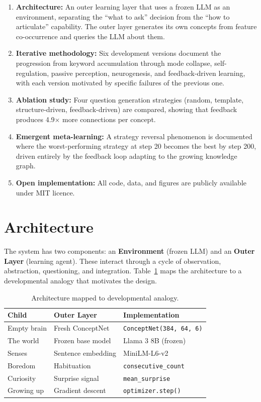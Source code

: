 \documentclass[conference]{IEEEtran}
\begin{document}
\begin{enumerate}[leftmargin=*]
\item \textbf{Architecture:} An outer learning layer that uses a frozen LLM as an environment, separating the ``what to ask'' decision from the ``how to articulate'' capability. The outer layer generates its own concepts from feature co-occurrence and queries the LLM about them.
\item \textbf{Iterative methodology:} Six development versions document the progression from keyword accumulation through mode collapse, self-regulation, passive perception, neurogenesis, and feedback-driven learning, with each version motivated by specific failures of the previous one.
\item \textbf{Ablation study:} Four question generation strategies (random, template, structure-driven, feedback-driven) are compared, showing that feedback produces 4.9$\times$ more connections per concept.
\item \textbf{Emergent meta-learning:} A strategy reversal phenomenon is documented where the worst-performing strategy at step 20 becomes the best by step 200, driven entirely by the feedback loop adapting to the growing knowledge graph.
\item \textbf{Open implementation:} All code, data, and figures are publicly available under MIT licence.
\end{enumerate}


\section{Architecture}
\label{sec:arch}

The system has two components: an \textbf{Environment} (frozen LLM) and an \textbf{Outer Layer} (learning agent). These interact through a cycle of observation, abstraction, questioning, and integration. Table~\ref{tab:analogy} maps the architecture to a developmental analogy that motivates the design.

\begin{table}[!htbp]
\centering
\caption{Architecture mapped to developmental analogy.}
\begin{tabular}{lll}
\toprule
\textbf{Child} & \textbf{Outer Layer} & \textbf{Implementation} \\
\midrule
Empty brain & Fresh ConceptNet & \texttt{ConceptNet(384, 64, 6)} \\
The world & Frozen base model & Llama 3 8B (frozen) \\
Senses & Sentence embedding & MiniLM-L6-v2 \\
Boredom & Habituation & \texttt{consecutive\_count} \\
Curiosity & Surprise signal & \texttt{mean\_surprise} \\
Growing up & Gradient descent & \texttt{optimizer.step()} \\
\bottomrule
\end{tabular}
\label{tab:analogy}
\end{table}
\end{document}
